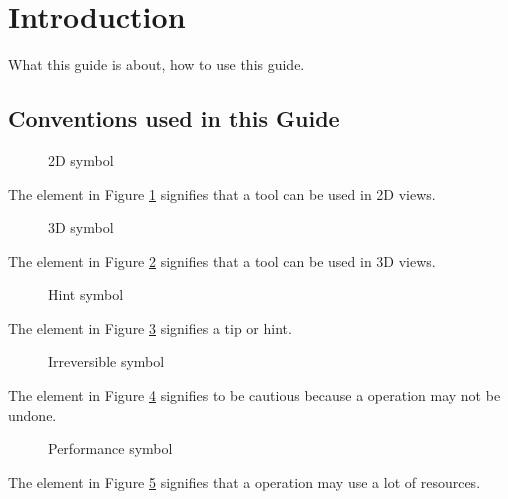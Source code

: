 \section{Introduction}
What this guide is about, how to use this guide.

\subsection{Conventions used in this Guide}
\begin{figure}[h!] %
	\centering
	
	\caption{2D symbol}\label{fig:2d_icon}
\end{figure}
\noindent
The element in Figure \ref{fig:2d_icon} signifies that a tool can be used in 2D views.\newline

\begin{figure}[h!] %
	\centering
	
	\caption{3D symbol}\label{fig:3d_icon}
\end{figure}
\noindent
The element in Figure \ref{fig:3d_icon} signifies that a tool can be used in 3D views.\newline

\begin{figure}[h!] %
	\centering
	
	\caption{Hint symbol}\label{fig:hint_icon}
\end{figure}
\noindent
The element in Figure \ref{fig:hint_icon} signifies a tip or hint.\newline

\begin{figure}[h!] %
	\centering
	
	\caption{Irreversible symbol}\label{fig:noundo_icon}
\end{figure}
\noindent
The element in Figure \ref{fig:noundo_icon} signifies to be cautious because a operation may not be undone.\pagebreak

\begin{figure}[h!] %
	\centering
	
	\caption{Performance symbol}\label{fig:performance_icon}
\end{figure}
\noindent
The element in Figure \ref{fig:performance_icon} signifies that a operation may use a lot of resources.\newline

